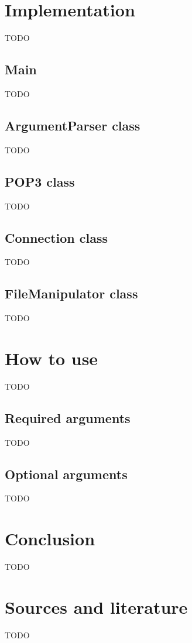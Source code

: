 \documentclass{article}
\begin{document}
\newpage

\section{Implementation}
TODO
\subsection{Main}
TODO
\subsection{ArgumentParser class}
TODO
\subsection{POP3 class}
TODO
\subsection{Connection class}
TODO
\subsection{FileManipulator class}
TODO

\newpage

\section{How to use}
TODO
\subsection{Required arguments}
TODO
\subsection{Optional arguments}
TODO

\newpage

\section{Conclusion}
TODO

\newpage

\section{Sources and literature}
TODO
\end{document}
